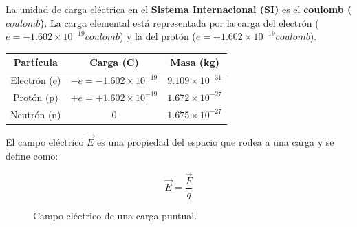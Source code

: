 La unidad de carga eléctrica en el \textbf{Sistema Internacional (SI)} es el \textbf{coulomb (\( \si{coulomb} \))}. La carga elemental está representada por la carga del electrón (\( e = -1.602 \times 10^{-19} \si{coulomb} \)) y la del protón (\( e = +1.602 \times 10^{-19} \si{coulomb} \)).

\begin{center}
    \setlength{\arrayrulewidth}{1pt}  %
    \renewcommand{\arraystretch}{1.3} %

    \begin{tabular}{ c c c }
        \hline\hline
        \rowcolor{asparagus!30}
        \textbf{Partícula} & \textbf{Carga (\si{C})} & \textbf{Masa (\si{kg})} \\ \hline
        Electrón (e)  & \(-e = -1.602 \times 10^{-19}\)  & \(9.109 \times 10^{-31}\) \\
        Protón (p)    & \(+e = +1.602 \times 10^{-19}\)  & \(1.672 \times 10^{-27}\) \\
        Neutrón (n)   & \(0\)                           & \(1.675 \times 10^{-27}\) \\ \hline\hline
    \end{tabular}
\end{center}



El campo eléctrico \( \vec{E} \) es una propiedad del espacio que rodea a una carga y se define como:

\begin{equation}
    \vec{E} = \frac{\vec{F}}{q}
\end{equation}

\begin{figure}[ht]
    \centering
    \caption{Campo eléctrico de una carga puntual.}
    \label{fig:campo_electrico}
\end{figure}


% 
% 